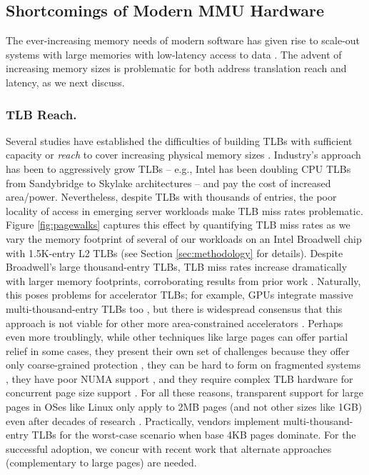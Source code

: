 \subsection{Shortcomings of Modern MMU Hardware}
The ever-increasing memory needs of modern software has given rise to
scale-out systems with large memories with low-latency access to data
\cite{ferdman:clearing, karakostas:performance, volos:fat,
  basu:efficient}. The advent of increasing memory sizes is
problematic for both address translation reach and latency, as we next
discuss.

\subsubsection{TLB Reach.}
Several studies have established the difficulties of building TLBs
with sufficient capacity or {\it reach} to cover increasing physical
memory sizes \cite{basu:efficient, haria:devirtualizing,
  pham:colt}. Industry's approach has been to aggressively grow TLBs
-- e.g., Intel has been doubling CPU TLBs from Sandybridge to Skylake
architectures -- and pay the cost of increased
area/power. Nevertheless, despite TLBs with thousands of entries, the
poor locality of access in emerging server workloads make TLB miss
rates problematic. Figure \ref{fig:pagewalks} captures this effect by
quantifying TLB miss rates as we vary the memory footprint of several
of our workloads on an Intel Broadwell chip with 1.5K-entry L2 TLBs
(see Section \ref{sec:methodology} for details). Despite Broadwell's
large thousand-entry TLBs, TLB miss rates increase dramatically with
larger memory footprints, corroborating results from prior work
\cite{basu:efficient}. Naturally, this poses problems for accelerator
TLBs; for example, GPUs integrate massive multi-thousand-entry TLBs
too \cite{vesely:observation, lowepower:inferring}, but there is
widespread consensus that this approach is not viable for other more
area-constrained accelerators \cite{haria:devirtualizing,
  picorel:near-memory}. Perhaps even more troublingly, while other
techniques like large pages can offer partial relief in some cases,
they present their own set of challenges because they offer only
coarse-grained protection \cite{pham:large}, they can be hard to form
on fragmented systems \cite{kwon:coordinated}, they have poor NUMA
support \cite{gaud:large}, and they require complex TLB hardware for
concurrent page size support \cite{cox:efficient}. For all these
reasons, transparent support for large pages in OSes like Linux only
apply to 2MB pages (and not other sizes like 1GB) even after decades
of research \cite{arcangeli:transparent}.  Practically, vendors
implement multi-thousand-entry TLBs for the worst-case scenario when
base 4KB pages dominate. For the successful adoption, we concur with
recent work \cite{pham:colt, basu:efficient, karakostas:redundant,
  haria:devirtualizing} that alternate approaches (complementary to
large pages) are needed.

